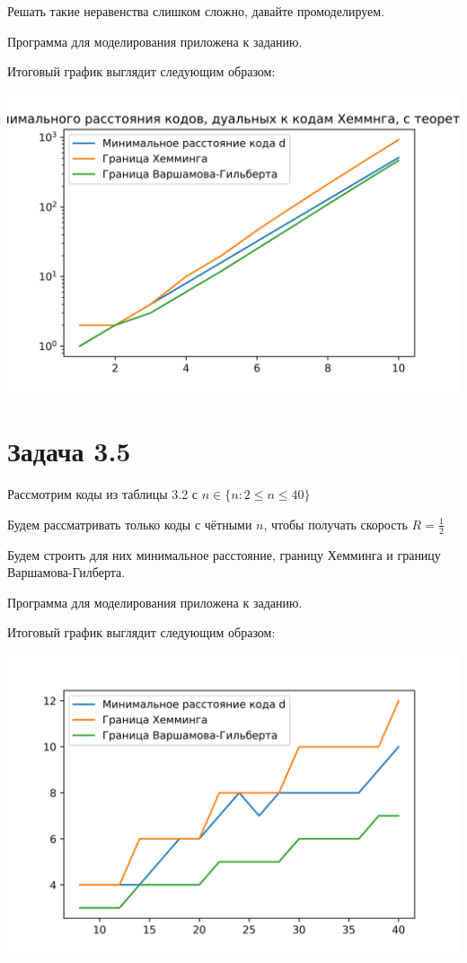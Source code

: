 \documentclass{article}
\begin{document}
	Решать такие неравенства слишком сложно, давайте промоделируем.
	
	Программа для моделирования приложена к заданию.
	
	Итоговый график выглядит следующим образом:
	
	\includegraphics[scale=1]{pic/dist.png}
	
	\section{Задача 3.5}
	
	Рассмотрим коды из таблицы 3.2 с $n \in \{n: 2 \leq n \leq 40\}$
	
	Будем рассматривать только коды с чётными $n$, чтобы получать скорость $R = \frac{1}{2}$
	
	Будем строить для них минимальное расстояние, границу Хемминга и границу Варшамова-Гилберта.
	
	Программа для моделирования приложена к заданию.
	
	Итоговый график выглядит следующим образом:
	
	\includegraphics[scale=1]{pic/dist2.png}
\end{document}
